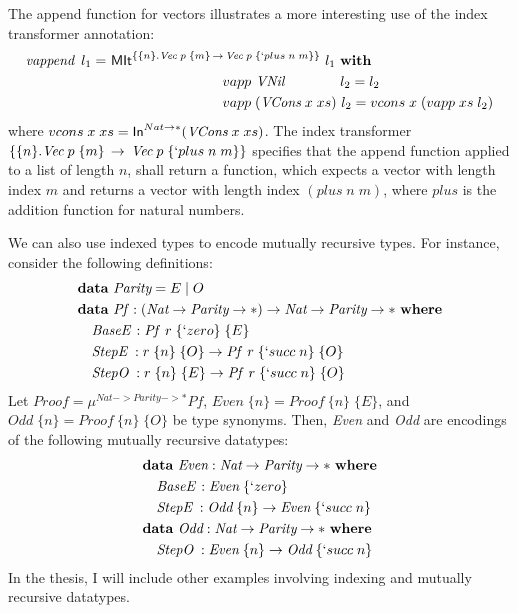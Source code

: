 The append function for vectors illustrates a more interesting use of
the index transformer annotation:
\begin{align*}
\textit{vappend}~\,l_1 =~ &
 \textsf{MIt}^{\{\{n\} . \textit{Vec}\;p\;\{m\} \, -> \, \textit{Vec}\;p\;\{`plus\;n\;m\}\}}~l_1
 ~\textbf{with} \\
&\qquad\qquad\qquad\qquad  vapp ~\textit{VNil}~~~~~~~~~~~ ~ l_2 = l_2 \\
&\qquad\qquad\qquad\qquad  vapp \;(\textit{VCons}\;x\;xs) ~ l_2 = vcons\;x\;(vapp\;xs\;l_2)
\end{align*}
where $vcons\;x\;xs = \textsf{In}^{Nat -> *}(\textit{VCons}\;x\;xs)$.
The index transformer
$\{\{n\} . \textit{Vec}\;p\;\{m\} \, -> \, \textit{Vec}\;p\;\{`plus\;n\;m\}\}$
specifies that the append function applied to a list of length $n$,
shall return a function, which expects a vector with length index $m$
and returns a vector with length index $(plus\;n\;m)$, where $plus$ is the addition
function for natural numbers.

We can also use indexed types to encode mutually recursive types.
For instance, consider the following definitions:
\begin{align*}
&\textbf{data}~ \textit{Parity} = E \mid O \\
&\textbf{data}~ \textit{Pf}\, : (\textit{Nat} -> \textit{Parity} -> *) ->
                                    \textit{Nat} -> \textit{Parity} -> *
  ~\textbf{where}\\
&\quad \textit{BaseE}\, : \textit{Pf}~\,r\;\{`zero\}\;\{E\} \\
&\quad \textit{StepE}\; : r\;\{n\}\;\{O\} -> \textit{Pf}~\,r\;\{`succ\;n\}\;\{O\} \\
&\quad \textit{StepO}\; : r\;\{n\}\;\{E\} -> \textit{Pf}~\,r\;\{`succ\;n\}\;\{O\}
\end{align*}
Let $\textit{Proof} = \mu^{\textit{Nat} -> \textit{Parity} -> *} \textit{Pf}$,
$\textit{Even}\;\{n\} = \textit{Proof}~\{n\}\;\{E\}$, and
$\textit{Odd}\;\{n\} = \textit{Proof}~\{n\}\;\{O\}$ be type synonyms.
Then, \textit{Even} and \textit{Odd} are encodings of the following
mutually recursive datatypes:
\begin{align*}
&\textbf{data}~\textit{Even} : \textit{Nat} -> \textit{Parity} -> *
 ~\textbf{where} \\
&\quad \textit{BaseE}\, : \textit{Even}\;\{`zero\}\\
&\quad \textit{StepE}\; : \textit{Odd}\;\{n\} -> \textit{Even}\;\{`succ\;n\} \\
&\textbf{data}~\textit{Odd} : \textit{Nat} -> \textit{Parity} -> *
 ~\textbf{where} \\
&\quad \textit{StepO}\; : \textit{Even}\;\{n\} -> \textit{Odd}\;\{`succ\;n\}
\end{align*}
In the thesis, I will include other examples involving indexing and
mutually recursive datatypes.


